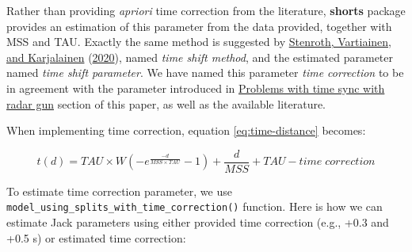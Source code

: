 \documentclass[fleqn,10pt,lineno]{wlpeerj} %
\begin{document}
Rather than providing \emph{apriori} time correction from the literature, \textbf{shorts} package provides an estimation of this parameter from the data provided, together with MSS and TAU. Exactly the same method is suggested by \protect\hyperlink{ref-stenrothForcevelocityProfilingIce2020}{Stenroth, Vartiainen, and Karjalainen} (\protect\hyperlink{ref-stenrothForcevelocityProfilingIce2020}{2020}), named \emph{time shift method}, and the estimated parameter named \emph{time shift parameter}. We have named this parameter \emph{time correction} to be in agreement with the parameter introduced in \protect\hyperlink{problems-with-time-sync-with-radar-gun}{Problems with time sync with radar gun} section of this paper, as well as the available literature.

When implementing time correction, equation \eqref{eq:time-distance} becomes:

\begin{equation}
  t(d) = TAU \times W(-e^{\frac{-d}{MSS \times TAU}} - 1) + \frac{d}{MSS} + TAU - time \; correction \label{eq:time-correction}
\end{equation}

To estimate time correction parameter, we use \texttt{model\_using\_splits\_with\_time\_correction()} function. Here is how we can estimate Jack parameters using either provided time correction (e.g., +0.3 and +0.5 s) or estimated time correction:
\end{document}
